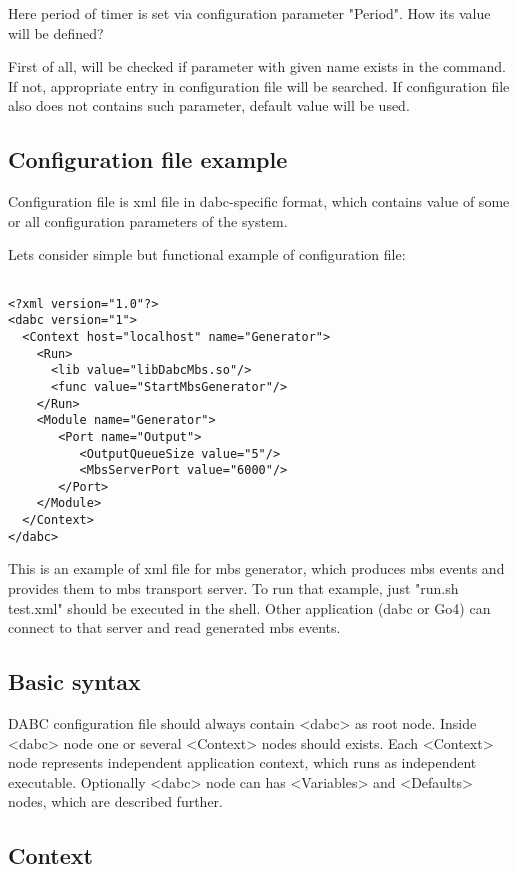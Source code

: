 Here period of timer is set via configuration parameter "Period". How its value will be defined? 

First of all, will be checked if parameter with given name exists in the command.
If not, appropriate entry in configuration file will be searched. If configuration file also
does not contains such parameter, default value will be used.


\subsection{Configuration file example}

Configuration file is xml file in dabc-specific format, which contains 
value of some or all configuration parameters of the system. 

Lets consider simple but functional example of configuration file:

\begin{verbatim}

<?xml version="1.0"?>
<dabc version="1">
  <Context host="localhost" name="Generator">
    <Run>
      <lib value="libDabcMbs.so"/>
      <func value="StartMbsGenerator"/>
    </Run>
    <Module name="Generator">
       <Port name="Output">
          <OutputQueueSize value="5"/>
          <MbsServerPort value="6000"/>
       </Port>
    </Module>
  </Context>
</dabc>

\end{verbatim}

This is an example of xml file for mbs generator, which produces 
mbs events and provides them to mbs transport server. 
To run that example, just "run.sh test.xml" should be executed in the shell.
Other application
(dabc or Go4) can connect to that server and read generated mbs events.


\subsection{Basic syntax}

DABC configuration file should always contain <dabc> as root node. 
Inside <dabc> node one or several <Context> nodes should exists.
Each <Context> node represents independent application context, which runs as
independent executable. 
Optionally <dabc> node can has <Variables> and <Defaults> nodes, which are described further. 


\subsection{Context}

